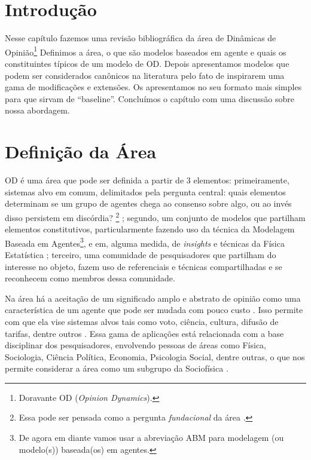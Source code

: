 \section{Introdução}

Nesse capítulo fazemos uma revisão bibliográfica da área de Dinâmicas de
Opinião\footnote{Doravante OD (\textit{Opinion Dynamics}).} Definimos a área, o
que são modelos baseados em agente e quais os constituintes típicos de um modelo
de OD. Depois apresentamos modelos que podem ser considerados canônicos na
literatura  pelo fato de inspirarem uma gama de modificações e extensões. Os
apresentamos no seu formato mais simples para que sirvam de ``baseline''.
Concluímos o capítulo com uma discussão sobre nossa abordagem.


\section{Definição da Área}

OD é uma área que pode ser definida a partir de 3 elementos: primeiramente,
sistemas alvo em comum, delimitados pela pergunta central: quais elementos
determinam se um grupo de agentes chega ao consenso sobre algo, ou ao invés
disso persistem em discórdia? \cite{castellano2012social}\footnote{Essa pode ser
  pensada como a pergunta \textit{fundacional} da área \cite{flache2017}.} ;
segundo, um conjunto de modelos que partilham elementos constitutivos,
particularmente fazendo uso da técnica da Modelagem Baseada em
Agentes\footnote{De agora em diante vamos usar a abreviação ABM para modelagem
  (ou modelo(s)) baseada(os) em agentes.}, e em, alguma medida, de
\textit{insights} e técnicas da Física Estatística \cite{galam1990social};
terceiro, uma comunidade de pesquisadores que partilham do interesse no objeto,
fazem uso de referenciais e técnicas compartilhadas e se reconhecem como membros
dessa comunidade.

Na área há a aceitação de um significado amplo e abstrato de opinião como uma
característica de um agente que pode ser mudada com pouco custo
\cite[p.312]{castellano2012social}. Isso permite com que ela vise sistemas alvos
tais como voto, ciência, cultura, difusão de tarifas, dentre outros
\cite{kowalska2013going,martins2015thou,axelrod1997dissemination,galam1990social}.
Essa gama de aplicações está relacionada com a base disciplinar dos pesquisadores,
envolvendo pessoas de áreas como Física, Sociologia, Ciência Política, Economia,
Psicologia Social, dentre outras, o que nos permite considerar a área como um
subgrupo da Sociofísica \cite{galam1982sociophysics,galam2012sociophysics}.


